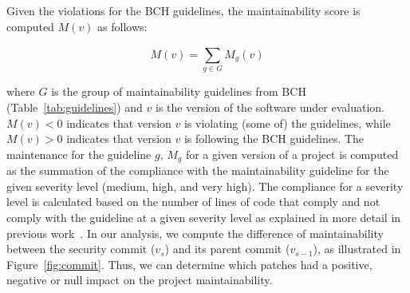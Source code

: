 \documentclass[sigconf,review]{acmart}
\begin{document}
Given the violations for the BCH guidelines, the maintainability score is computed
$M(v)$ as follows:

\begin{equation}
    M(v) = \sum_{g \in G}^{} M_{g}(v)
\end{equation}

\noindent
where $G$ is the group of maintainability guidelines from BCH
(Table~\ref{tab:guidelines}) and $v$ is the version of the software under
evaluation. $M(v) < 0$ indicates that version $v$ is violating (some of) the
guidelines, while $M(v) > 0$ indicates that version $v$ is following
the BCH guidelines. The maintenance for the guideline $g$, $M_g$ for a given version
of a project is computed as the summation of the compliance with the 
maintainability guideline for the given severity level (medium, high, and very high).
The compliance for a severity level
is calculated based on the number of lines of code that comply and not comply
with the guideline at a given severity level as explained in more
detail in previous work~\cite{cruz2019energyoriented}. In our analysis, we compute 
the difference of maintainability between the security commit ($v_{s}$) and its parent 
commit ($v_{s-1}$), as illustrated in Figure~\ref{fig:commit}. Thus, we can determine 
which patches had a positive, negative or null impact on the project maintainability. 
%
%
%
%
\end{document}
